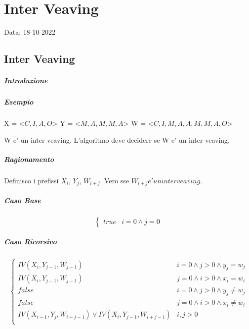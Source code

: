 \chapter{Inter Veaving}
Data: 18-10-2022

\section{Inter Veaving}

\paragraph{Introduzione}

\paragraph{Esempio}

X = <$C, I, A, O$>
Y = <$M, A, M, M, A$>
W = <$C, I, M, A, A, M, M, A, O$>

W e' un inter veaving. L'algoritmo deve decidere se W e' un inter veaving.

\paragraph{Ragionamento}

Definisco i prefissi $X_i$, $Y_j$, $W_{i+j}$.
Vero sse $W_{i+j} e' un inter veaving$.

\paragraph{Caso Base}

\[
    \begin{cases}
        \text{$true$} & \text{$i = 0 \land j = 0$}
    \end{cases}
\]

\paragraph{Caso Ricorsivo}

\[
    \begin{cases}
        \text{$IV(X_i, Y_{j - 1}, W_{j-1})$} & \text{$i = 0 \land j > 0 \land y_j = w_j$} \\
        \text{$IV(X_i, Y_{j - 1}, W_{j-1})$} & \text{$j = 0 \land i > 0 \land x_i = w_i$} \\
        \text{$false$} & \text{$i = 0 \land j > 0 \land y_j \ne w_j$} \\
        \text{$false$} & \text{$j = 0 \land i > 0 \land x_i \ne w_i$} \\
        \text{$IV(X_{i-1}, Y_j, W_{i+j-1})\lor IV(X_i, Y_{j-1}, W_{i+j-1})$} & \text{$i,j > 0$} \\
    \end{cases}
\]


